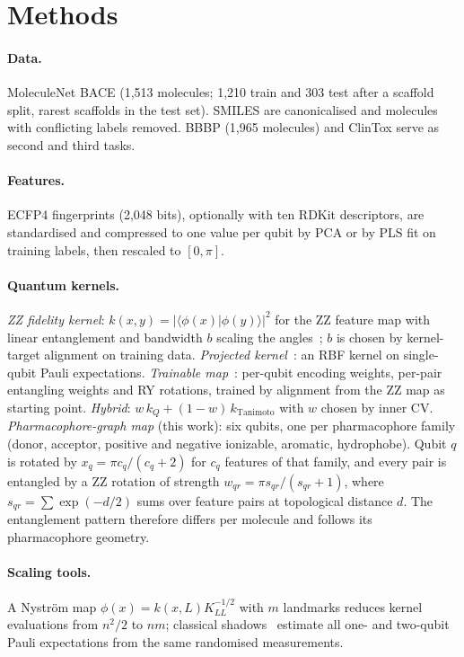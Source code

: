 \documentclass[11pt]{article}
\begin{document}
\section{Methods}
\paragraph{Data.} MoleculeNet BACE (1{,}513 molecules; 1{,}210 train and 303 test after a
scaffold split, rarest scaffolds in the test set). SMILES are canonicalised and molecules with
conflicting labels removed. BBBP (1{,}965 molecules) and ClinTox serve as second and third tasks.

\paragraph{Features.} ECFP4 fingerprints (2{,}048 bits), optionally with ten RDKit descriptors,
are standardised and compressed to one value per qubit by PCA or by PLS fit on training labels,
then rescaled to $[0,\pi]$.

\paragraph{Quantum kernels.}
\emph{ZZ fidelity kernel}: $k(x,y)=|\langle\phi(x)|\phi(y)\rangle|^2$ for the ZZ feature map with
linear entanglement and bandwidth $b$ scaling the angles~\cite{shaydulin2022}; $b$ is chosen by
kernel-target alignment on training data.
\emph{Projected kernel}~\cite{huang2021}: an RBF kernel on single-qubit Pauli expectations.
\emph{Trainable map}~\cite{hubregtsen2022}: per-qubit encoding weights, per-pair entangling
weights and RY rotations, trained by alignment from the ZZ map as starting point.
\emph{Hybrid}: $w\,k_Q + (1-w)\,k_{\text{Tanimoto}}$ with $w$ chosen by inner CV.
\emph{Pharmacophore-graph map} (this work): six qubits, one per pharmacophore family (donor,
acceptor, positive and negative ionizable, aromatic, hydrophobe). Qubit $q$ is rotated by
$x_q=\pi c_q/(c_q+2)$ for $c_q$ features of that family, and every pair is entangled by a ZZ
rotation of strength $w_{qr}=\pi s_{qr}/(s_{qr}+1)$, where
$s_{qr}=\sum \exp(-d/2)$ sums over feature pairs at topological distance $d$. The entanglement
pattern therefore differs per molecule and follows its pharmacophore geometry.

\paragraph{Scaling tools.} A Nystr\"om map $\phi(x)=k(x,L)K_{LL}^{-1/2}$ with $m$ landmarks reduces
kernel evaluations from $n^2/2$ to $nm$; classical shadows~\cite{huang2020} estimate all one-
and two-qubit Pauli expectations from the same randomised measurements.
\end{document}
